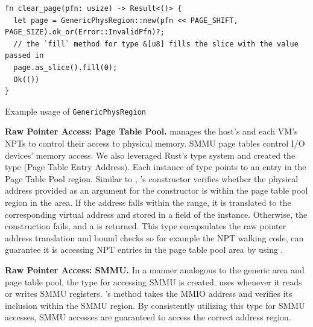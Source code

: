 \begin{listing}[hbtp]
    \begin{verbatim}
fn clear_page(pfn: usize) -> Result<()> {
  let page = GenericPhysRegion::new(pfn << PAGE_SHIFT, PAGE_SIZE).ok_or(Error::InvalidPfn)?;
  // the `fill` method for type &[u8] fills the slice with the value passed in
  page.as_slice().fill(0);
  Ok(())
}
    \end{verbatim}
    \caption{Example usage of \texttt{GenericPhysRegion}}
    \label{lst:genericusage}
    \vspace{-0.2cm}
\end{listing}

\textbf{Raw Pointer Access: Page Table Pool.}
\rustcore{} manages the host's and each VM's NPTs to control their access to
physical memory. SMMU page tables control I/O devices' memory access.
We also leveraged Rust's type system and created the
type  (Page Table Entry Address). Each instance of type 
points to an entry in the \rustcore{} Page Table Pool region.
Similar to , 's constructor verifies whether the physical address provided as an
argument for the constructor is within the page table pool region in the \rustcore{}
area. If the address falls within the range, it is translated to the
corresponding virtual address and stored in a field of the
 instance. Otherwise, the construction fails, and a
 is returned.
This type encapsulates the raw pointer address translation and bound
checks so for example the NPT walking code,
can guarantee it is accessing NPT entries in the
\rustcore{} page table pool area by using .

\textbf{Raw Pointer Access: SMMU.}
In a manner analogous to the generic area and page table pool, the type
 for accessing SMMU is created.
\rustcore{} uses  whenever it reads or writes SMMU registers.
's  method takes the MMIO address and
verifies its inclusion within the SMMU region.
By consistently utilizing this type for SMMU accesses, SMMU accesses are
guaranteed to access the correct address region.
